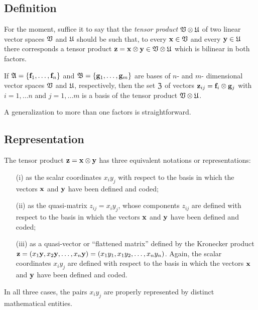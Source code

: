 \subsection{Definition}

For the moment, suffice it to say that
the {\em tensor product}
 ${\frak V} \otimes {\frak U}$
of two linear vector spaces  ${\frak V}$ and  ${\frak U}$
should be such that,
to every
${\bf x} \in  {\frak V}$
and every
${\bf y} \in  {\frak U}$
there corresponds a tensor product ${\bf z} = {\bf x} \otimes {\bf y}
\in {\frak V} \otimes {\frak U}$
which is bilinear in both factors.

If ${\frak A} =\{{\bf f}_1,\ldots , {\bf f}_n\}$ and
${\frak B} =\{{\bf g}_1,\ldots , {\bf g}_m\}$
are bases of  $n$- and $m$-
dimensional vector spaces ${\frak V}$ and  ${\frak U}$, respectively,
then the set
${\frak Z}$ of vectors ${\bf z}_{ij}= {\bf f}_i \otimes {\bf g}_j$
with $i=1,\ldots n$ and $j=1,\ldots m$
 is a basis of the { tensor product}
 ${\frak V} \otimes {\frak U}$.

A generalization to more than one factors is straightforward.

\subsection{Representation}

The tensor product ${\bf z} = {\bf x} \otimes {\bf y}$
has three equivalent notations or representations:
\begin{itemize}
\item[(i)]
as the scalar coordinates $x_iy_j$ with respect to the basis in which the vectors ${\bf  x}$ and ${\bf y}$ have been defined and coded;
\item[(ii)]
as the quasi-matrix $z_{ij}  =x_iy_j$, whose components $z_{ij}$ are  defined with respect to the basis in which the vectors ${\bf  x}$ and ${\bf y}$ have been defined and coded;
\item[(iii)]
as a quasi-vector or ``flattened matrix'' defined by the Kronecker product
${\bf z} = ({ x}_1  {\bf y}, { x}_2  {\bf y}, \ldots , { x}_n  {\bf y})=
({ x}_1  { y}_1, { x}_1  { y}_2, \ldots , { x}_n  { y}_n)
$. Again, the scalar coordinates $x_iy_j$ are defined
with respect to the basis in which the vectors ${\bf  x}$ and ${\bf y}$ have been defined and coded.
\end{itemize}
In all three cases, the pairs $x_iy_j$  are properly represented by distinct mathematical entities.


